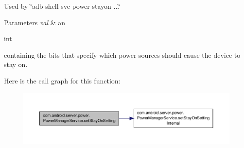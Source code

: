 Used by \char`\"{}adb shell svc power stayon ...\char`\"{}


\begin{DoxyParams}{Parameters}
{\em val} & an
\begin{DoxyCode}
\textcolor{keywordtype}{int} 
\end{DoxyCode}
 containing the bits that specify which power sources should cause the device to stay on. \\
\hline
\end{DoxyParams}


Here is the call graph for this function\-:
\nopagebreak
\begin{figure}[H]
\begin{center}
\leavevmode
\includegraphics[width=350pt]{classcom_1_1android_1_1server_1_1power_1_1PowerManagerService_ab81abded4b2577f62081dcf7d9659630_cgraph}
\end{center}
\end{figure}


